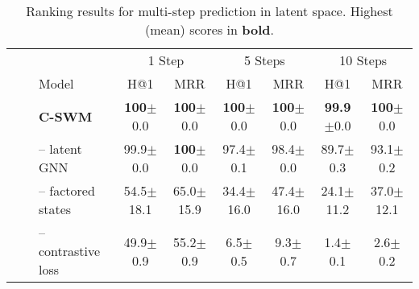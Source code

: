 \documentclass{article} %
\begin{document}
\begin{table}[ht]
\centering
\caption{\label{tab:results_node}Ranking results for multi-step prediction in latent space. Highest (mean) scores in \textbf{bold}.}

\begin{adjustbox}{center,width=0.9\linewidth}
\begin{tabular}{lllcccccc}
\toprule
  & & & \multicolumn{2}{c}{1 Step} & \multicolumn{2}{c}{5 Steps} & \multicolumn{2}{c}{10 Steps} \\ \cmidrule(lr){4-5} \cmidrule(lr){6-7} \cmidrule(lr){8-9}
&&Model & H@1 & MRR & H@1 & MRR & H@1 & MRR      \\ \midrule
\multicolumn{2}{c}{\parbox[t]{2mm}{}} &\bf C-SWM& {\bf100}{\color{lightgrey}\tiny$\pm$0.0} &  {\bf100}{\color{lightgrey}\tiny$\pm$0.0} & {\bf100}{\color{lightgrey}\tiny$\pm$0.0} & {\bf100}{\color{lightgrey}\tiny$\pm$0.0} & {\bf99.9}{\color{lightgrey}\tiny$\pm$0.0} & {\bf100}{\color{lightgrey}\tiny$\pm$0.0} \\
&&-- latent GNN & 99.9{\color{lightgrey}\tiny$\pm$0.0} & {\bf100}{\color{lightgrey}\tiny$\pm$0.0} & 97.4{\color{lightgrey}\tiny$\pm$0.1} & 98.4{\color{lightgrey}\tiny$\pm$0.0} & 89.7{\color{lightgrey}\tiny$\pm$0.3} & 93.1{\color{lightgrey}\tiny$\pm$0.2} \\
&&-- factored states & 54.5{\color{lightgrey}\tiny$\pm$18.1} & 65.0{\color{lightgrey}\tiny$\pm$15.9} & 34.4{\color{lightgrey}\tiny$\pm$16.0}  & 47.4{\color{lightgrey}\tiny$\pm$16.0} & 24.1{\color{lightgrey}\tiny$\pm$11.2} & 37.0{\color{lightgrey}\tiny$\pm$12.1} \\
&&-- contrastive loss & 49.9{\color{lightgrey}\tiny$\pm$0.9} & 55.2{\color{lightgrey}\tiny$\pm$0.9} & 6.5{\color{lightgrey}\tiny$\pm$0.5} & 9.3{\color{lightgrey}\tiny$\pm$0.7} & 1.4{\color{lightgrey}\tiny$\pm$0.1} & 2.6{\color{lightgrey}\tiny$\pm$0.2}


\end{tabular}
\end{adjustbox}
\end{table}
\end{document}
